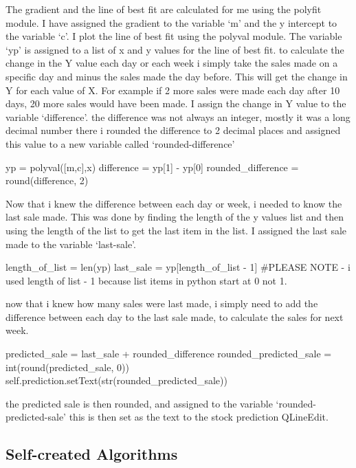 The gradient and the line of best fit are calculated for me using the polyfit module. I have assigned the gradient to the variable `m' and the y intercept to the variable `c'. I plot the line of best fit using the polyval module. The variable `yp' is assigned to a list of x and y values for the line of best fit. to calculate the change in the Y value each day or each week i simply take the sales made on a specific day and minus the sales made the day before. This will get the change in Y for each value of X. For example if 2 more sales were made each day after 10 days, 20 more sales would have been made. I assign the change in Y value to the variable `difference'. the difference was not always an integer, mostly it was a long decimal number there i rounded the difference to 2 decimal places and assigned this value to a new variable called `rounded-difference'

\begin{python}
yp = polyval([m,c],x)
difference = yp[1] - yp[0]
rounded_difference = round(difference, 2)
\end{python}

Now that i knew the difference between each day or week, i needed to know the last sale made. This was done by finding the length of the y values list and then using the length of the list to get the last item in the list. I assigned the last sale made to the variable `last-sale'.

\begin{python}
length_of_list = len(yp)
last_sale = yp[length_of_list - 1]
#PLEASE NOTE - i used length of list - 1 because list items in python start at 0 not 1.
\end{python}

now that i knew how many sales were last made, i simply need to add the difference between each day to the last sale made, to calculate the sales for next week.

\begin{python}
predicted_sale = last_sale + rounded_difference
rounded_predicted_sale = int(round(predicted_sale, 0))
self.prediction.setText(str(rounded_predicted_sale))
\end{python}

the predicted sale is then rounded, and assigned to the variable `rounded-predicted-sale' this is then set as the text to the stock prediction QLineEdit.

\subsection{Self-created Algorithms}


